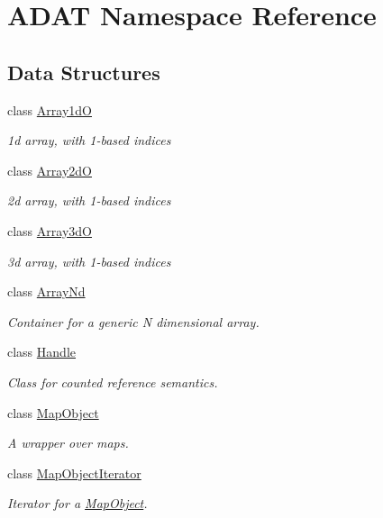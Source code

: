 \hypertarget{namespaceADAT}{}\section{A\+D\+AT Namespace Reference}
\label{namespaceADAT}
\subsection*{Data Structures}
\begin{DoxyCompactItemize}
\item 
class \mbox{\hyperlink{classADAT_1_1Array1dO}{Array1dO}}
\begin{DoxyCompactList}\small\item\em 1d array, with 1-\/based indices \end{DoxyCompactList}\item 
class \mbox{\hyperlink{classADAT_1_1Array2dO}{Array2dO}}
\begin{DoxyCompactList}\small\item\em 2d array, with 1-\/based indices \end{DoxyCompactList}\item 
class \mbox{\hyperlink{classADAT_1_1Array3dO}{Array3dO}}
\begin{DoxyCompactList}\small\item\em 3d array, with 1-\/based indices \end{DoxyCompactList}\item 
class \mbox{\hyperlink{classADAT_1_1ArrayNd}{Array\+Nd}}
\begin{DoxyCompactList}\small\item\em Container for a generic N dimensional array. \end{DoxyCompactList}\item 
class \mbox{\hyperlink{classADAT_1_1Handle}{Handle}}
\begin{DoxyCompactList}\small\item\em Class for counted reference semantics. \end{DoxyCompactList}\item 
class \mbox{\hyperlink{classADAT_1_1MapObject}{Map\+Object}}
\begin{DoxyCompactList}\small\item\em A wrapper over maps. \end{DoxyCompactList}\item 
class \mbox{\hyperlink{classADAT_1_1MapObjectIterator}{Map\+Object\+Iterator}}
\begin{DoxyCompactList}\small\item\em Iterator for a \mbox{\hyperlink{classADAT_1_1MapObject}{Map\+Object}}. \end{DoxyCompactList}\item 

\end{DoxyCompactItemize}
